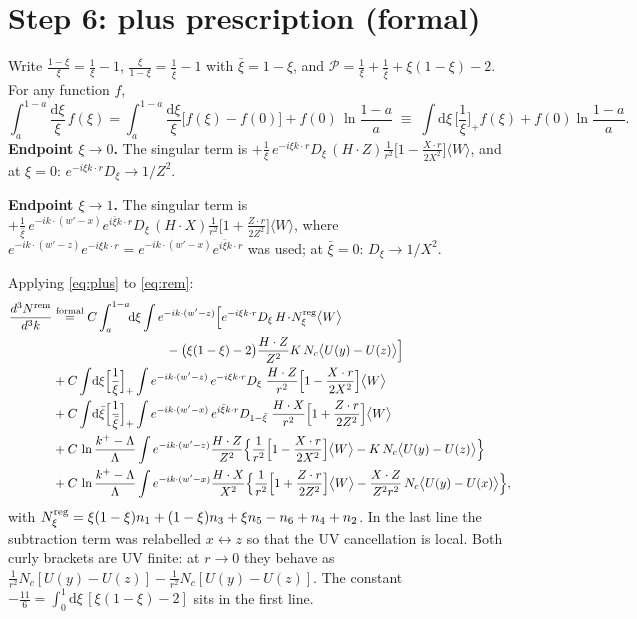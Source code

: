 \documentclass[11pt,a4paper]{article}
\newcommand{\dd}{\mathrm{d}}
\newcommand{\Nc}{N_c}
\newcommand{\cl}[1]{\big\langle #1\big\rangle}
\begin{document}
\section{Step 6: plus prescription (formal)}
Write $\frac{1-\xi}{\xi}=\frac1\xi-1$, $\frac{\xi}{1-\xi}=\frac{1}{\bar\xi}-1$ with $\bar\xi=1-\xi$, and
$\mathcal P=\frac1\xi+\frac1{\bar\xi}+\xi(1-\xi)-2$. For any function $f$,
\begin{equation}
\int_a^{1-a}\frac{\dd\xi}{\xi}\,f(\xi)=\int_a^{1-a}\frac{\dd\xi}{\xi}\big[f(\xi)-f(0)\big]+f(0)\,\ln\frac{1-a}{a}
\;\equiv\;\int\!\dd\xi\,\Big[\frac1\xi\Big]_+f(\xi)+f(0)\ln\frac{1-a}{a}.
\label{eq:plus}
\end{equation}
\textbf{Endpoint $\xi\to0$.} The singular term is
$+\frac1\xi\,e^{-i\xi k\cdot r}D_\xi\,(H\!\cdot\! Z)\frac{1}{r^2}\big[1-\frac{X\cdot r}{2X^2}\big]\cl W$,
and at $\xi=0$: $e^{-i\xi k\cdot r}D_\xi\to1/Z^2$.

\textbf{Endpoint $\xi\to1$.} The singular term is
$+\frac1{\bar\xi}\,e^{-ik\cdot(w'-x)}e^{i\bar\xi k\cdot r}D_\xi\,(H\!\cdot\! X)\frac{1}{r^2}\big[1+\frac{Z\cdot r}{2Z^2}\big]\cl W$,
where $e^{-ik\cdot(w'-z)}e^{-i\xi k\cdot r}=e^{-ik\cdot(w'-x)}e^{i\bar\xi k\cdot r}$ was used; at
$\bar\xi=0$: $D_\xi\to1/X^2$.

Applying \eqref{eq:plus} to \eqref{eq:rem}:
\begin{align}
\frac{d^3N^{\rm rem}}{d^3k}&\overset{\text{formal}}{=}
C\int_a^{1-a}\!\!\dd\xi\int e^{-ik\cdot(w'-z)}\Big[e^{-i\xi k\cdot r}D_\xi\,H\!\cdot\!N^{\rm reg}_\xi\cl W\notag\\
&\hspace{3.2cm}-\big(\xi(1-\xi)-2\big)\frac{H\cdot Z}{Z^2}K\,\Nc\cl{U(y)-U(z)}\Big]\notag\\
&+C\int\!\dd\xi\Big[\frac1\xi\Big]_+\int e^{-ik\cdot(w'-z)}\,e^{-i\xi k\cdot r}D_\xi\;
\frac{H\cdot Z}{r^2}\Big[1-\frac{X\cdot r}{2X^2}\Big]\cl W\notag\\
&+C\int\!\dd\bar\xi\Big[\frac1{\bar\xi}\Big]_+\int e^{-ik\cdot(w'-x)}\,e^{i\bar\xi k\cdot r}D_{1-\bar\xi}\;
\frac{H\cdot X}{r^2}\Big[1+\frac{Z\cdot r}{2Z^2}\Big]\cl W\notag\\
&+C\,\ln\frac{k^+-\Lambda}{\Lambda}\int e^{-ik\cdot(w'-z)}\frac{H\cdot Z}{Z^2}
\Big\{\frac{1}{r^2}\Big[1-\frac{X\cdot r}{2X^2}\Big]\cl W-K\,\Nc\cl{U(y)-U(z)}\Big\}\notag\\
&+C\,\ln\frac{k^+-\Lambda}{\Lambda}\int e^{-ik\cdot(w'-x)}\frac{H\cdot X}{X^2}
\Big\{\frac{1}{r^2}\Big[1+\frac{Z\cdot r}{2Z^2}\Big]\cl W-\frac{X\cdot Z}{Z^2r^2}\,\Nc\cl{U(y)-U(x)}\Big\},
\label{eq:formal}
\end{align}
with $N^{\rm reg}_\xi=\xi(1-\xi)n_1+(1-\xi)n_3+\xi n_5-n_6+n_4+n_2$. In the last line the subtraction
term was relabelled $x\leftrightarrow z$ so that the UV cancellation is local. Both curly brackets are UV
finite: at $r\to0$ they behave as $\frac{1}{r^2}\Nc[U(y)-U(z)]-\frac1{r^2}\Nc[U(y)-U(z)]$.
The constant $-\tfrac{11}{6}=\int_0^1\!\dd\xi\,[\xi(1-\xi)-2]$ sits in the first line.
\end{document}
